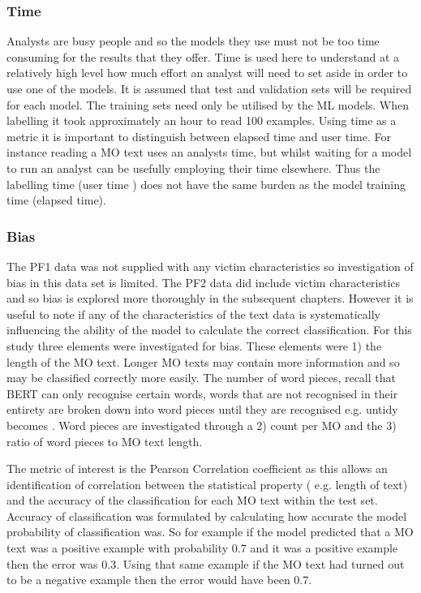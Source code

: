  \subsubsection{Time} Analysts are busy people and so the models they use must not be too time consuming for the results that they offer. Time is used here to understand at a relatively high level how much effort an analyst will need to set aside in order to use one of the models. It is assumed that test and validation sets will be required for each model. The training sets need only be utilised by the ML models. When labelling it took approximately an hour to read 100 examples. Using time as a metric it is important to distinguish between elapsed time and user time. For instance reading a MO text uses an analysts time, but whilst waiting for a model to run an analyst can be usefully employing their time elsewhere. Thus the labelling time (user time ) does not have the same burden as the model training time (elapsed time).
 
\subsubsection{Bias} \label{study1-bias}The PF1 data was not supplied with any victim characteristics so investigation of bias in this data set is limited. The PF2 data did include victim characteristics and so bias is explored more thoroughly in the subsequent chapters. However it is useful to note if any of the characteristics of the text data is systematically influencing the ability of the model to calculate the correct classification. For this study three elements were investigated for bias. These elements were 1) the length of the MO text. Longer MO texts may contain more information and so may be classified correctly more easily. The number of word pieces, recall that BERT can only recognise certain words, words that are not recognised in their entirety are broken down into word pieces until they are recognised e.g. untidy becomes . Word pieces are investigated through a 2) count per MO and the 3) ratio of word pieces to MO text length.

The metric of interest is the Pearson Correlation coefficient as this allows an identification of correlation between the statistical property ( e.g. length of text) and the accuracy of the classification for each MO text within the test set. Accuracy of classification was formulated by calculating how accurate the model probability of classification was. So for example if the model predicted that a MO text was a positive example with probability 0.7 and it was a positive example then the error was 0.3. Using that same example if the MO text had turned out to be a negative example then the error would have been 0.7.

